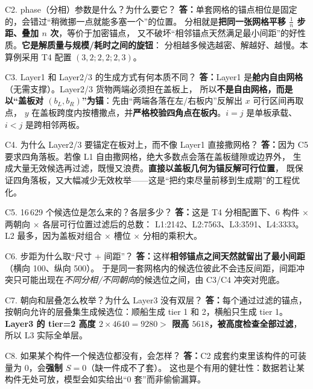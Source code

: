 \documentclass[11pt]{ctexart}
\newcommand{\A}{\textbf{答：}}
\begin{document}
\begin{qa}{C2. phase（分相）参数是什么？为什么要它？}
\A 单套网格的锚点相位是固定的，会错过“稍微挪一点就能多塞一个”的位置。
分相就是\textbf{把同一张网格平移 $\tfrac{1}{n}$ 步距、叠加 $n$ 次}，等价于加密锚点，
又不破坏“相邻锚点天然满足最小间距”的好性质。\textbf{它是解质量与规模/耗时之间的旋钮}：
分相越多候选越密、解越好、越慢。本算例采用 T4 配置 $(3,2;2,2;2,3)$。
\end{qa}

\begin{qa}{C3. Layer1 和 Layer2/3 的生成方式有何本质不同？}
\A Layer1 是\textbf{舱内自由网格}（无需支撑）。Layer2/3 货物两端必须担在盖板上，
所以\textbf{不是自由网格，而是以“盖板对 $(b_L,b_R)$”为锚}：先由“两端各落在左/右板内”反解出 $x$ 可行区间再取点，
$y$ 在盖板跨度内按槽撒点，并\textbf{严格校验四角点在板内}。$i=j$ 是单板承载、$i<j$ 是跨相邻两板。
\end{qa}

\begin{qa}{C4. 为什么 Layer2/3 要锚定在板对上，而不像 Layer1 直接撒网格？}
\A 因为 C5 要求四角落板。若像 L1 自由撒网格，绝大多数点会落在盖板缝隙或边界外，
生成大量无效候选再过滤，既慢又浪费。\textbf{直接以盖板几何为锚反解可行位置}，
既保证四角落板，又大幅减少无效枚举——这是“把约束尽量前移到生成期”的工程优化。
\end{qa}

\begin{qa}{C5. 16\,629 个候选位是怎么来的？各层多少？}
\A 这是 T4 分相配置下、6 构件 $\times$ 两朝向 $\times$ 各层可行位置过滤后的总数：
L1:2142、L2:7563、L3:3591、L4:3333。L2 最多，因为盖板对组合 $\times$ 槽位 $\times$ 分相的乘积大。
\end{qa}

\begin{qa}{C6. 步距为什么取“尺寸 + 间距”？}
\A 这样\textbf{相邻锚点之间天然就留出了最小间距}（横向 100、纵向 500）。
于是同一套网格内的候选位彼此不会违反间距，间距冲突只可能出现在\emph{不同分相/不同朝向}的候选位之间，由 C3/C4 冲突对兜底。
\end{qa}

\begin{qa}{C7. 朝向和层叠怎么枚举？为什么 Layer3 没有双层？}
\A 每个通过过滤的锚点，按朝向允许的层叠集生成候选位：顺船生成 tier 1 和 2，横船只生成 tier 1。
\textbf{Layer3 的 tier=2 高度 $2\times4640=9280>$ 限高 $5618$，被高度检查全部过滤}，所以 L3 实际全单层。
\end{qa}

\begin{qa}{C8. 如果某个构件一个候选位都没有，会怎样？}
\A C2 成套约束里该构件的可装量为 0，会\textbf{强制 $S=0$}（缺一件成不了套）。
这也是个有用的健壮性：数据若让某构件无处可放，模型会如实给出“0 套”而非偷偷漏算。
\end{qa}
\end{document}

